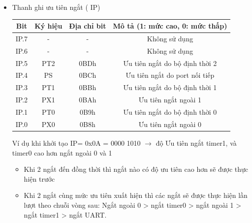 \documentclass[../report.tex]{subfiles}
\begin{document}
\begin{itemize}
\begin{center}
        \end{center}
        
    
    \item Thanh ghi ưu tiên ngắt ( IP)
        \begin{center}
                    \begin{tabular}{ |c|c|c|c| } 
                    \hline
                    Bit & Ký hiệu & Địa chỉ bit &  Mô tả (1: mức cao, 0: mức thấp) \\
                    \hline
                    IP.7 & - & - & Không sử dụng \\
                    IP.6 & - & - & Không sử dụng \\
                    IP.5 & PT2 & 0BDh & Ưu tiên ngắt do bộ định thời 2 \\
                    IP.4 & PS & 0BCh & Ưu tiên ngắt do port nối tiếp \\                
                    IP.3 & PT1 & 0BBh & Ưu tiên ngắt do bộ định thời 1 \\                    
                    IP.2 & PX1 & 0BAh & Ưu tiên ngắt ngoài 1 \\
                    IP.1 & PT0 & 0B9h & Ưu tiên ngắt do bộ định thời 0\\
                    IP.0 & PX0 & 0B8h & Ưu tiên ngắt ngoài 0 \\
                    \hline
                    \end{tabular}
                    
        \end{center}

        Ví dụ khi khởi tạo IP= 0x0A = 0000 1010 $\rightarrow$ độ Ưu tiên ngắt timer1, và timer0 cao hơn ngắt ngoài 0 và 1
        \begin{itemize}
            \item Khi 2 ngắt đến đồng thời thì ngắt nào có độ ưu tiên cao hơn sẽ được thực hiện trước
            \item Khi 2 ngắt cùng mức ưu tiên xuất hiện thì các ngắt sẽ được thực hiện lần lượt theo chuỗi vòng sau: 
            		Ngắt ngoài 0 > ngắt timer0 > ngắt ngoài 1 > ngắt timer1 > ngắt UART.
        \end{itemize}
        
\end{itemize}
\end{document}
